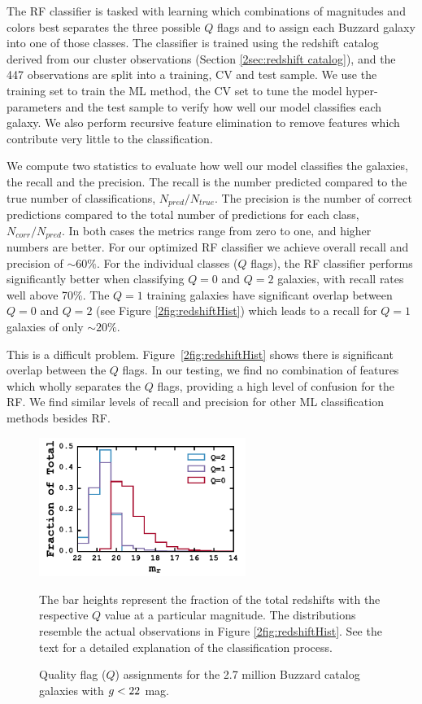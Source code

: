 The RF classifier is tasked with learning which combinations of magnitudes and colors best separates the three possible $Q$ flags and to assign each Buzzard galaxy into one of those classes. The classifier is trained using the redshift catalog derived from our cluster observations (Section \ref{2sec:redshift catalog}), and the 447 observations are split into a training, CV and test sample. We use the training set to train the ML method, the CV set to tune the model hyper-parameters and the test sample to verify how well our model classifies each galaxy. We also perform recursive feature elimination to remove features which contribute very little to the classification.

We compute two statistics to evaluate how well our model classifies the galaxies, the recall and the precision. The recall is the number predicted compared to the true number of classifications, $N_{pred}/N_{true}$. The precision is the number of correct predictions compared to the total number of predictions for each class, $N_{corr}/N_{pred}$. In both cases the metrics range from zero to one, and higher numbers are better. For our optimized RF classifier we achieve overall recall and precision of $\sim60\%$. For the individual classes ($Q$ flags), the RF classifier performs significantly better when classifying $Q=0$ and $Q=2$ galaxies, with recall rates well above 70\%. The $Q=1$ training galaxies have significant overlap between $Q=0$ and $Q=2$ (see Figure \ref{2fig:redshiftHist}) which leads to a recall for $Q=1$ galaxies of only $\sim20\%$. 

This is a difficult problem. Figure~\ref{2fig:redshiftHist} shows there is significant overlap between the $Q$ flags. In our testing, we find no combination of features which wholly separates the $Q$ flags, providing a high level of confusion for the RF. We find similar levels of recall and precision for other ML classification methods besides RF.

\begin{figure}[t]
	\begin{center}
		\includegraphics[width=0.6\textwidth]{figures2/buzzardQHist.pdf}
	\end{center}
	\caption{Quality flag ($Q$) assignments for the 2.7 million Buzzard catalog galaxies with $\hbox{$g$}< 22$ mag.} 
	The bar heights represent the fraction of the total redshifts with the respective $Q$ value at a particular magnitude. The distributions resemble the actual observations in Figure \ref{2fig:redshiftHist}. See the text for a detailed explanation of the classification process. \label{2fig:buzzardHist} 
\end{figure}

